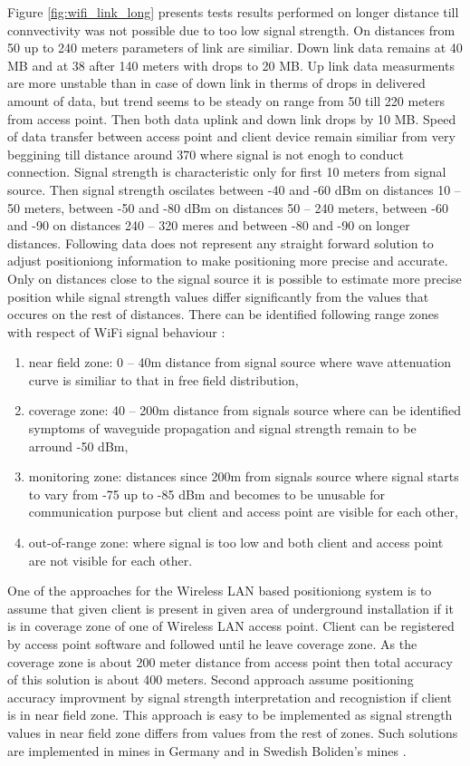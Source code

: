 \documentclass[../main.tex]{subfiles}
\begin{document}
Figure \ref{fig:wifi_link_long} presents tests results performed on longer distance till connvectivity was not possible due to too low signal strength. On distances from 50 up to 240 meters parameters of link are similiar. Down link data remains at 40 MB and at 38 after 140 meters with drops to 20 MB. Up link data measurments are more unstable than in case of down link in therms of drops in delivered amount of data, but trend seems to be steady on range from 50 till 220 meters from access point. Then both data uplink and down link drops by 10 MB.  Speed of data transfer between access point and client device remain similiar from very beggining till distance around 370 where signal is not enogh to conduct connection. Signal strength is characteristic only for first 10 meters from signal source. Then signal strength oscilates between -40 and -60 dBm on distances 10 -- 50 meters, between -50 and -80 dBm on distances 50 -- 240 meters, between -60 and -90 on distances 240 -- 320 meres and between -80 and -90 on longer distances. Following data does not represent any straight forward solution to adjust positioniong information to make positioning more precise and accurate. Only on distances close to the signal source it is possible to estimate more precise position while signal strength values differ significantly from the values that occures on the rest of distances. There can be identified following range zones with respect of WiFi signal behaviour \cite{Thesis_CM}:
\begin{enumerate}
	\item near field zone: 0 -- 40m distance from signal source where wave attenuation curve is similiar to that in free field distribution,
	\item coverage zone: 40 -- 200m distance from signals source where can be identified symptoms of waveguide propagation and signal strength remain to be arround -50 dBm,
	\item monitoring zone: distances since 200m from signals source where signal starts to vary from -75 up to -85 dBm and becomes to be unusable for communication purpose but client and access point are visible for each other,
	\item out-of-range zone: where signal is too low and both client and access point are not visible for each other.
\end{enumerate}

One of the approaches for the Wireless LAN based positioniong system is to assume that given client is present in given area of underground installation if it is in coverage zone of one of Wireless LAN access point. Client can be registered by access point software and followed until he leave coverage zone. As the coverage zone is about 200 meter distance from access point then total accuracy of this solution is about 400 meters. Second approach assume positioning accuracy improvment by signal strength interpretation and recognistion if client is in near field zone. This approach is easy to be implemented as signal strength values in near field zone differs from values from the rest of zones. Such solutions are implemented in mines in Germany \cite{Thesis_CM} and in Swedish Boliden's mines \cite{thesis_tablet_positioning}.
\end{document}
